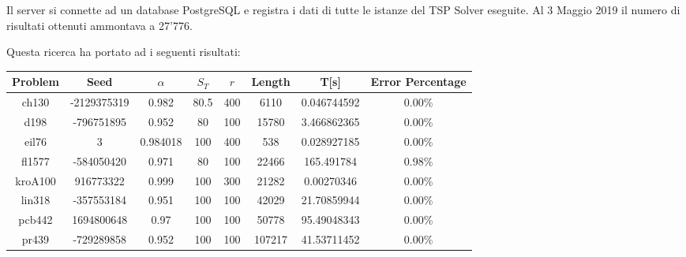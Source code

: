\documentclass{article}
\begin{document}
Il server si connette ad un database PostgreSQL e registra i dati di tutte le istanze
del TSP Solver eseguite. Al 3 Maggio 2019 il numero di risultati ottenuti ammontava
a 27'776.

Questa ricerca ha portato ad i seguenti risultati:
\begin{table}[h]
    \begin{tabular}{|c|c|c|c|c|c|c|c|}
        \hline
        \textbf{Problem} & \textbf{Seed} & \textbf{$\alpha$} & \textbf{$S_T$} & \textbf{$r$} & \textbf{Length} & \textbf{T[s]} & \textbf{Error Percentage} \\\hline
        ch130            & -2129375319   & 0.982             & 80.5                          & 400          & 6110            & 0.046744592   & 0.00\%                      \\\hline                                                            %
        d198             & -796751895    & 0.952             & 80                            & 100          & 15780           & 3.466862365   & 0.00\%                      \\\hline                                                               %
        eil76            & 3             & 0.984018          & 100                           & 400          & 538             & 0.028927185   & 0.00\%                      \\\hline
        fl1577           & -584050420    & 0.971             & 80                            & 100          & 22466           & 165.491784    & 0.98\%                      \\\hline                                                              %
        kroA100          & 916773322     & 0.999             & 100                           & 300          & 21282           & 0.00270346    & 0.00\%                      \\\hline                                                        %
        lin318           & -357553184    & 0.951             & 100                           & 100          & 42029           & 21.70859944   & 0.00\%                      \\\hline                                                             %
        pcb442           & 1694800648    & 0.97              & 100                           & 100          & 50778           & 95.49048343   & 0.00\%                      \\\hline                                                           %
        pr439            & -729289858    & 0.952             & 100                           & 100          & 107217          & 41.53711452   & 0.00\%                      \\\hline                                                       %

\end{tabular}
\end{table}
\end{document}
